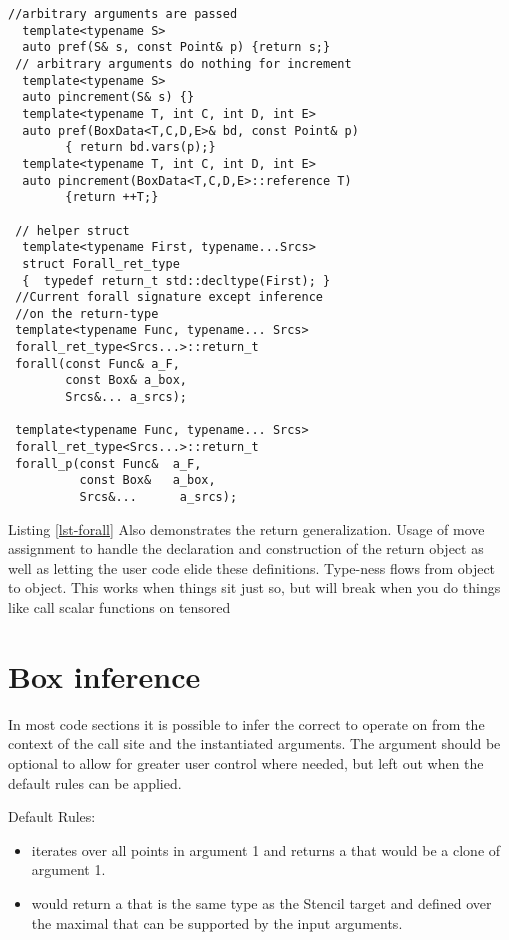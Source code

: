 \documentclass[12pt,a4paper]{article}
\begin{document}
\begin{minipage}{\linewidth}
  \begin{lstlisting}[caption=\code{forall} ,label=lst-forall]
 //arbitrary arguments are passed
  template<typename S>
  auto pref(S& s, const Point& p) {return s;}
 // arbitrary arguments do nothing for increment
  template<typename S>
  auto pincrement(S& s) {} 
  template<typename T, int C, int D, int E>
  auto pref(BoxData<T,C,D,E>& bd, const Point& p)
        { return bd.vars(p);}
  template<typename T, int C, int D, int E>
  auto pincrement(BoxData<T,C,D,E>::reference T)
        {return ++T;}
    
 // helper struct
  template<typename First, typename...Srcs>
  struct Forall_ret_type
  {  typedef return_t std::decltype(First); }
 //Current forall signature except inference
 //on the return-type
 template<typename Func, typename... Srcs> 
 forall_ret_type<Srcs...>::return_t
 forall(const Func& a_F,
        const Box& a_box,
        Srcs&... a_srcs);

 template<typename Func, typename... Srcs> 
 forall_ret_type<Srcs...>::return_t
 forall_p(const Func&  a_F,
          const Box&   a_box,
          Srcs&...      a_srcs);

  \end{lstlisting}
\end{minipage}

  Listing \ref{lst-forall} Also demonstrates the return generalization.  Usage of move assignment to handle the declaration and construction of the return object as well as letting the user code elide these definitions.  Type-ness flows from object to object. This works when things sit just so, but will break when you do things like call scalar functions on tensored 

  \section{ Box inference}

  In most code sections it is possible to infer the correct  to operate on from the context of the call site and the instantiated arguments. The  argument should be optional to allow for greater user control where needed, but left out when the default rules can be applied.

  Default Rules:
  \begin{itemize}
  \item {} iterates over all points in argument 1 and returns a  that would be a clone of argument 1.
  \item {} would return a  that is the same type as the Stencil target and defined over the maximal  that can be supported by the input arguments.
  \end{itemize}
\end{document}
